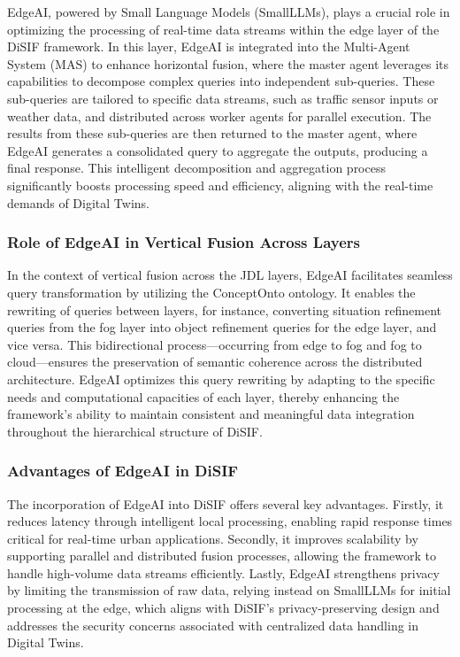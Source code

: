 \documentclass[5p,times]{elsarticle}
\begin{document}
EdgeAI, powered by Small Language Models (SmallLLMs),
 plays a crucial role in optimizing the processing of real-time data streams 
 within the edge layer of the DiSIF framework. In this layer, EdgeAI is integrated into
  the Multi-Agent System (MAS) to enhance horizontal fusion, where the master
   agent leverages its capabilities to decompose complex queries into independent sub-queries.
    These sub-queries are tailored to specific data streams, such as
     traffic sensor inputs or weather data, and distributed across worker agents for
      parallel execution. The results from these sub-queries are then
       returned to the master agent, where EdgeAI generates a consolidated query to
        aggregate the outputs, producing a final response. This intelligent
         decomposition and aggregation process significantly boosts processing speed
          and efficiency, aligning with the real-time demands of Digital Twins.

\subsubsection{Role of EdgeAI in Vertical Fusion Across Layers}

In the context of vertical fusion across the JDL layers,
 EdgeAI facilitates seamless query transformation by utilizing the ConceptOnto ontology. 
 It enables the rewriting of queries between layers, for instance,
  converting situation refinement queries from the fog layer into object
   refinement queries for the edge layer, and vice versa. This bidirectional
    process—occurring from edge to fog and fog to cloud—ensures the
     preservation of semantic coherence across the distributed architecture. 
     EdgeAI optimizes this query rewriting by adapting to the specific needs
      and computational capacities of each layer, thereby enhancing the
       framework's ability to maintain consistent and meaningful data integration
        throughout the hierarchical structure of DiSIF.

\subsubsection{Advantages of EdgeAI in DiSIF}

The incorporation of EdgeAI into DiSIF offers several key advantages.
 Firstly, it reduces latency through intelligent local processing, enabling
  rapid response times critical for real-time urban applications. Secondly,
   it improves scalability by supporting parallel and distributed fusion processes,
    allowing the framework to handle high-volume data streams efficiently.
     Lastly, EdgeAI strengthens privacy by limiting the transmission of raw data, 
     relying instead on SmallLLMs for initial processing at the edge, which aligns 
     with DiSIF’s privacy-preserving design and addresses the security concerns
      associated with centralized data handling in Digital Twins.
\end{document}

